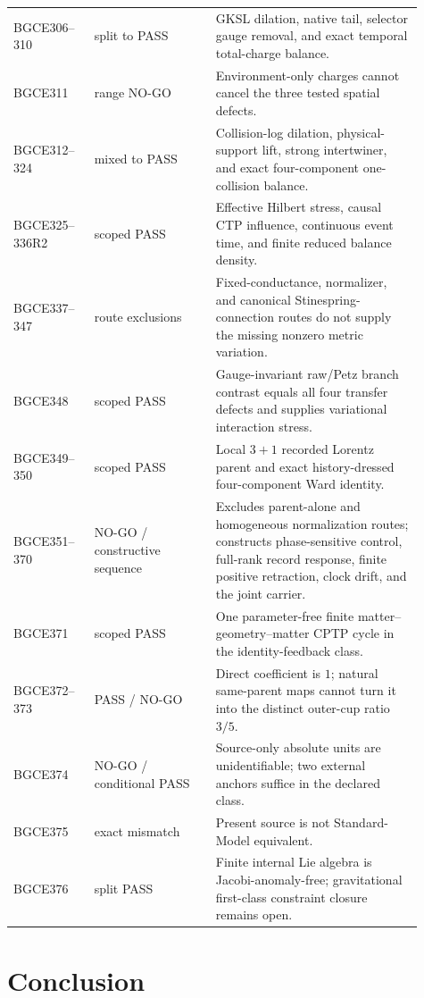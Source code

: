 \documentclass[11pt]{article}
\theoremstyle{definition}
\theoremstyle{remark}
\begin{document}
\begin{longtable}{>{\raggedright\arraybackslash}p{0.18\linewidth} >{\raggedright\arraybackslash}p{0.27\linewidth} >{\raggedright\arraybackslash}p{0.46\linewidth}}
BGCE306--310 & split to PASS & GKSL dilation, native tail, selector gauge removal, and exact temporal total-charge balance. \\
BGCE311 & range NO-GO & Environment-only charges cannot cancel the three tested spatial defects. \\
BGCE312--324 & mixed to PASS & Collision-log dilation, physical-support lift, strong intertwiner, and exact four-component one-collision balance. \\
BGCE325--336R2 & scoped PASS & Effective Hilbert stress, causal CTP influence, continuous event time, and finite reduced balance density. \\
BGCE337--347 & route exclusions & Fixed-conductance, normalizer, and canonical Stinespring-connection routes do not supply the missing nonzero metric variation. \\
BGCE348 & scoped PASS & Gauge-invariant raw/Petz branch contrast equals all four transfer defects and supplies variational interaction stress. \\
BGCE349--350 & scoped PASS & Local $3+1$ recorded Lorentz parent and exact history-dressed four-component Ward identity. \\
BGCE351--370 & NO-GO / constructive sequence & Excludes parent-alone and homogeneous normalization routes; constructs phase-sensitive control, full-rank record response, finite positive retraction, clock drift, and the joint carrier. \\
BGCE371 & scoped PASS & One parameter-free finite matter--geometry--matter CPTP cycle in the identity-feedback class. \\
BGCE372--373 & PASS / NO-GO & Direct coefficient is $1$; natural same-parent maps cannot turn it into the distinct outer-cup ratio $3/5$. \\
BGCE374 & NO-GO / conditional PASS & Source-only absolute units are unidentifiable; two external anchors suffice in the declared class. \\
BGCE375 & exact mismatch & Present source is not Standard-Model equivalent. \\
BGCE376 & split PASS & Finite internal Lie algebra is Jacobi-anomaly-free; gravitational first-class constraint closure remains open. \\
\bottomrule
\end{longtable}

\section{Conclusion}
\end{document}
